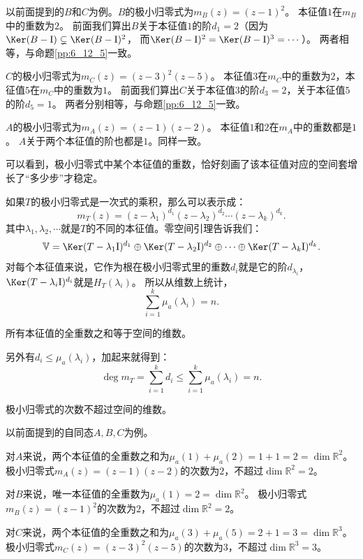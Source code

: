\documentclass[12pt,UTF8,fontset=none]{ctexbook}
\begin{document}
以前面提到的$B$和$C$为例。$B$的极小归零式为$m_B(z) = (z-1)^2$。
本征值$1$在$m_B$中的重数为$2$。
前面我们算出$B$关于本征值$1$的阶$d_1 = 2$（因为$\Ker(B-\mathrm{I}) \subsetneq \Ker(B-\mathrm{I})^2$，
而$\Ker(B-\mathrm{I})^2 = \Ker(B-\mathrm{I})^3 = \cdots$）。
两者相等，与命题\ref{pp:6_12_5}一致。

$C$的极小归零式为$m_C(z) = (z-3)^2(z-5)$。
本征值$3$在$m_C$中的重数为$2$，本征值$5$在$m_C$中的重数为$1$。
前面我们算出$C$关于本征值$3$的阶$d_3 = 2$，关于本征值$5$的阶$d_5 = 1$。
两者分别相等，与命题\ref{pp:6_12_5}一致。

$A$的极小归零式为$m_A(z) = (z-1)(z-2)$。
本征值$1$和$2$在$m_A$中的重数都是$1$。
$A$关于两个本征值的阶也都是$1$。同样一致。

可以看到，极小归零式中某个本征值的重数，恰好刻画了该本征值对应的空间套增长了“多少步”才稳定。

如果$T$的极小归零式是一次式的乘积，那么可以表示成：
$$ m_T(z) = (z - \lambda_1)^{d_1} (z - \lambda_2)^{d_2} \cdots  (z - \lambda_k)^{d_k}.$$
其中$\lambda_1, \lambda_2,\cdots$就是$T$的不同的本征值。零空间引理告诉我们：
$$ \mathbb{V} = \Ker (T - \lambda_1\mathrm{I})^{d_1} \oplus \Ker (T - \lambda_2\mathrm{I})^{d_2} \oplus \cdots \oplus \Ker (T - \lambda_k\mathrm{I})^{d_k}.$$
对每个本征值来说，它作为根在极小归零式里的重数$d_i$就是它的阶$d_{\lambda_i}$，
$\Ker (T - \lambda_i\mathrm{I})^{d_i}$就是$H_T(\lambda_i)$。
所以从维数上统计，
$$ \sum_{i=1}^k \mu_a(\lambda_i) = n.$$
\begin{pp}\label{pp:6_12_2_1}
    所有本征值的全重数之和等于空间的维数。
\end{pp}

另外有$d_i \leqslant \mu_a(\lambda_i)$，加起来就得到：
$$ \deg m_T = \sum_{i=1}^k d_i \leqslant \sum_{i=1}^k \mu_a(\lambda_i) = n.$$
\begin{pp}\label{pp:6_12_2_2}
    极小归零式的次数不超过空间的维数。
\end{pp}

以前面提到的自同态$A,B,C$为例。

对$A$来说，两个本征值的全重数之和为$\mu_a(1) + \mu_a(2) = 1 + 1 = 2 = \dim\mathbb{R}^2$。
极小归零式$m_A(z) = (z-1)(z-2)$的次数为$2$，不超过$\dim\mathbb{R}^2 = 2$。

对$B$来说，唯一本征值的全重数为$\mu_a(1) = 2 = \dim\mathbb{R}^2$。
极小归零式$m_B(z) = (z-1)^2$的次数为$2$，不超过$\dim\mathbb{R}^2 = 2$。

对$C$来说，两个本征值的全重数之和为$\mu_a(3) + \mu_a(5) = 2 + 1 = 3 = \dim\mathbb{R}^3$。
极小归零式$m_C(z) = (z-3)^2(z-5)$的次数为$3$，不超过$\dim\mathbb{R}^3 = 3$。
\end{document}
